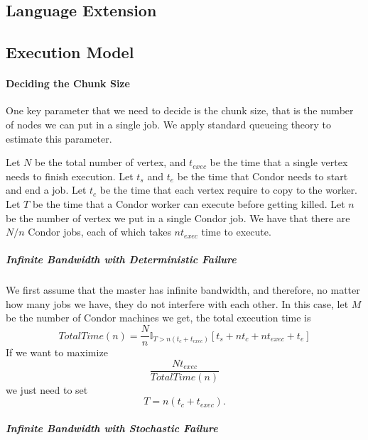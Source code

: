 \documentclass[11pt]{article}
\begin{document}
\subsection{Language Extension}

\subsection{Execution Model}


\paragraph*{Deciding the Chunk Size}

One key parameter that we need to decide is the
chunk size, that is the number of nodes we can
put in a single job. We apply standard queueing
theory to estimate this parameter. 

Let $N$ be the total number of vertex, and $t_{exec}$
be the time that a single vertex needs to
finish execution. Let $t_s$ and $t_e$ be the time
that Condor needs to start and end a job. Let
$t_c$ be the time that each vertex require to copy
to the worker.
Let $T$ be the time that a Condor worker can execute
before getting killed. Let $n$ be the number of 
vertex we put in a single Condor job.
%
We have that there are $N/n$ Condor jobs, each of which
takes $nt_{exec}$ time to execute. 

\subparagraph*{Infinite Bandwidth with Deterministic Failure}

We first assume that the master has infinite bandwidth,
and therefore, no matter how many jobs we have, they
do not interfere with each other. In this case, let
$M$ be the number of Condor machines we get, the
total execution time is
\[
TotalTime(n) = \frac{N}{n} \mathbb{I}_{T>n(t_c+t_{exec})} \left[ t_s + nt_c + nt_{exec}  + t_e \right]
\]
If we want to maximize
\[
\frac{Nt_{exec}}{TotalTime(n)}
\]
we just need to set
\[
T=n(t_c+t_{exec}).
\]

\subparagraph*{Infinite Bandwidth with Stochastic Failure}
\end{document}
